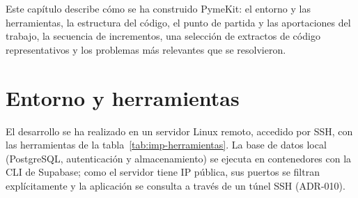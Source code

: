 

Este capítulo describe cómo se ha construido PymeKit: el entorno y las
herramientas, la estructura del código, el punto de partida y las aportaciones
del trabajo, la secuencia de incrementos, una selección de extractos de
código representativos y los problemas más relevantes que se resolvieron.

\section{Entorno y herramientas}
\label{sec:imp-entorno}

El desarrollo se ha realizado en un servidor Linux remoto, accedido por SSH,
con las herramientas de la tabla~\ref{tab:imp-herramientas}. La base de datos
local (PostgreSQL, autenticación y almacenamiento) se ejecuta en contenedores
con la CLI de Supabase; como el servidor tiene IP pública, sus puertos se
filtran explícitamente y la aplicación se consulta a través de un túnel SSH
(ADR-010).

